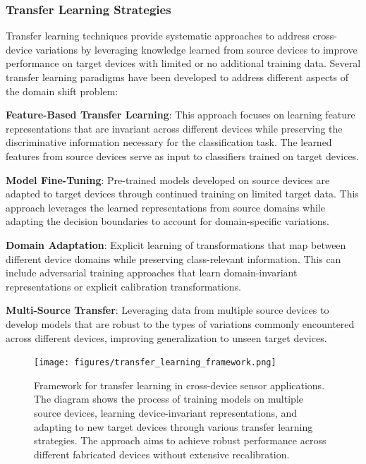 \subsubsection{Transfer Learning Strategies}

Transfer learning techniques provide systematic approaches to address cross-device variations by leveraging knowledge learned from source devices to improve performance on target devices with
limited or no additional training data. Several transfer learning paradigms have been developed to address different aspects of the domain shift problem:

\textbf{Feature-Based Transfer Learning}: This approach focuses on learning feature representations that are invariant across different devices while preserving the discriminative information
necessary for the classification task. The learned features from source devices serve as input to classifiers trained on target devices.

\textbf{Model Fine-Tuning}: Pre-trained models developed on source devices are adapted to target devices through continued training on limited target data. This approach leverages the learned
representations from source domains while adapting the decision boundaries to account for domain-specific variations.

\textbf{Domain Adaptation}: Explicit learning of transformations that map between different device domains while preserving class-relevant information. This can include adversarial training
approaches that learn domain-invariant representations or explicit calibration transformations.

\textbf{Multi-Source Transfer}: Leveraging data from multiple source devices to develop models that are robust to the types of variations commonly encountered across different devices, improving
generalization to unseen target devices.

\begin{figure}[htbp]
  \centering
  \texttt{[image: figures/transfer\_learning\_framework.png]}
  \caption{Framework for transfer learning in cross-device sensor applications. The diagram shows the process of training models on multiple source devices, learning device-invariant
representations, and adapting to new target devices through various transfer learning strategies. The approach aims to achieve robust performance across different fabricated devices without
extensive recalibration.}
  \label{fig:transfer_framework}
\end{figure}

